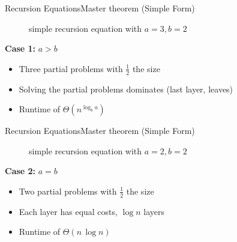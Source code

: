 
\begin{frame}{Recursion Equations}{Master theorem (Simple Form)}
  \begin{figure}[!h]
    \begin{adjustbox}{width=\linewidth}
      \def\AlgoREDivide{3}%
      \def\AlgoRESize{0.5}%
      \def\AlgoREScale{4.444}%
      
    \end{adjustbox}
    \caption{simple recursion equation with {\color{MainA}$a = 3, b = 2$}}
    \label{fig:recursion_equations:master_theorem_tree_3_2}
  \end{figure}
  \textbf{Case 1:} {\color{MainA}$a > b$}
  \begin{itemize}
    \item<3->
      Three partial problems with $\frac{1}{2}$ the size
    \item<4->
      Solving the partial problems dominates (last layer, leaves)
    \item<5->
      Runtime of {\color{MainA}$\Theta(n^{\log_b a})$}
  \end{itemize}
\end{frame}


\begin{frame}{Recursion Equations}{Master theorem (Simple Form)}
  \begin{figure}[!h]
    \begin{adjustbox}{width=\linewidth}
      \def\AlgoREDivide{2}%
      \def\AlgoRESize{0.5}%
      \def\AlgoREScale{15}%
      
    \end{adjustbox}
    \caption{simple recursion equation with {\color{MainA}$a = 2, b = 2$}}
    \label{fig:recursion_equations:master_theorem_tree_2_2}
  \end{figure}
  \textbf{Case 2:} {\color{MainA}$a = b$}
  \begin{itemize}
    \item<3->
      Two partial problems with $\frac{1}{2}$ the size
    \item<4->
      Each layer has equal costs, $\log n$ layers
    \item<5->
      Runtime of {\color{MainA}$\Theta(n \, \log n)$}
  \end{itemize}
\end{frame}

